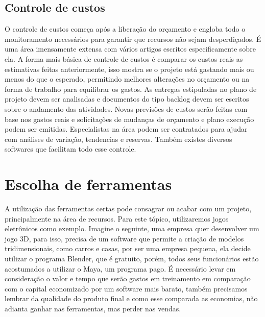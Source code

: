 \documentclass{article}
\begin{document}
\subsection{Controle de custos}
O controle de custos começa após a liberação do orçamento e engloba todo o monitoramento necessários para garantir que recursos não sejam desperdiçados. É uma área imensamente extensa com vários artigos escritos especificamente sobre ela. A forma mais básica de controle de custos é comparar os custos reais as estimativas feitas anteriormente, isso mostra se o projeto está gastando mais ou menos do que o esperado, permitindo melhores alterações no orçamento ou na forma de trabalho para equilibrar os gastos. As entregas estipuladas no plano de projeto devem ser analisadas e documentos do tipo backlog devem ser escritos sobre o andamento das atividades. Novas previsões de custos serão feitas com base nos gastos reais e solicitações de mudanças de orçamento e plano execução podem ser emitidas. Especialistas na área podem ser contratados para ajudar com análises de variação, tendencias e reservas. Também existes diversos softwares que facilitam todo esse controle.


\section{Escolha de ferramentas}
A utilização das ferramentas certas pode consagrar ou acabar com um projeto, principalmente na área de recursos. Para este tópico, utilizaremos jogos eletrônicos como exemplo. Imagine o seguinte, uma empresa quer desenvolver um jogo 3D, para isso, precisa de um software que permite a criação de modelos tridimensionais, como carros e casas, por ser uma empresa pequena, ela decide utilizar o programa Blender, que é gratuito, porém, todos seus funcionários estão acostumados a utilizar o Maya, um programa pago. É necessário levar em consideração o valor e tempo que serão gastos em treinamento em comparação com o capital economizado por um software mais barato, também precisamos lembrar da qualidade do produto final e como esse comparada as economias, não adianta ganhar nas ferramentas, mas perder nas vendas.
\end{document}
